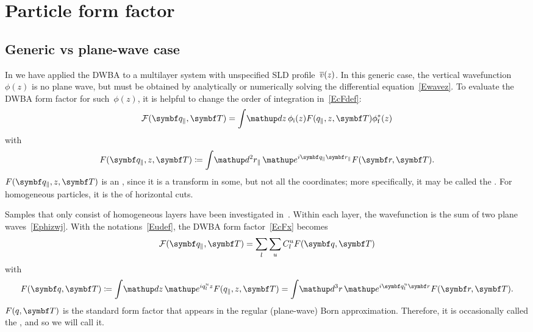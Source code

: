\section{Particle form factor}\label{SFormFactor}


\subsection{Generic vs plane-wave case}

In  we have applied the DWBA to a multilayer system
with unspecified SLD profile~$\overline{v}(z)$.
In this generic case,
the vertical wavefunction~$\phi(z)$ is no plane wave,
but must be obtained
by analytically or numerically solving the differential equation~\cref{Ewavez}.
To evaluate the DWBA form factor for such~$\phi(z)$,
it is helpful to change the order of integration in~\cref{EcFdef}:
\begin{equation}\label{EcFx}
  {\cal F}(\q_\parallel,\v{T})
   = \int\!\d z\, \phi_\si(z) F(q_\parallel,z,\v{T}) \phi^*_\sf(z)
\end{equation}
with
\begin{equation}\label{EFqpadef}
  F(\q_\parallel,z,\v{T})
  \coloneqq \int\!\d^2 r_\parallel\, \e^{i\q_\parallel \r_\parallel} F(\r,\v{T}).
\end{equation}
$F(\q_\parallel,z,\v{T})$ is an ,
since it is a transform in some, but not all the coordinates;
more specifically, it may be called the .
For homogeneous particles,
it is the  of horizontal cuts.

Samples that only consist of homogeneous layers
have been investigated in~.
Within each layer, the wavefunction is the sum of two plane waves~\cref{Ephizwj}.
With the notations~\cref{Eudef},
the DWBA form factor~\cref{EcFx} becomes
\begin{equation}\label{EcFres1}
  {\cal F}(\q_\parallel,\v{T})
   = \sum_l \sum_u C^u_l F(\q,\v{T})
\end{equation}
with
\begin{equation}\label{EcFres1}
  F(\q,\v{T})
  \coloneqq \int\!\d z\, \e^{iq^u_l z} F(q_\parallel,z,\v{T})
   = \int\!\d^3 r\, \e^{i\q^u_l \r} F(\r,\v{T}).
\end{equation}
$F(q,\v{T})$ is the standard form factor
that appears in the regular (plane-wave) Born approximation.
Therefore, it is occasionally called the ,
and so we will call it.



